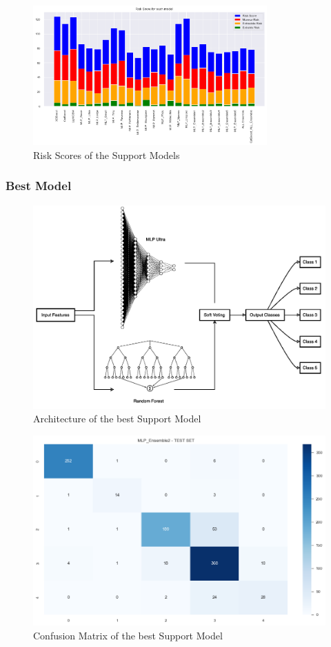 \begin{figure}[t]
    \centering
    \includegraphics[width=0.8\textwidth]{../images/support_models_risk_scores.png}
    \caption{Risk Scores of the Support Models}
    \label{fig:support_models_risk_scores}
\end{figure}

\subsubsection*{Best Model}

\begin{figure}[H]
    \centering
    \includegraphics[width=0.8\columnwidth]{../images/MLP_Ensamble2.png}
    \caption{Architecture of the best Support Model}
    \label{fig:MLP_Ensamble2}
\end{figure}
\begin{figure}[H]
    \centering
    \includegraphics[width=0.8\columnwidth]{../images/support_models_conf_matrix.png}
    \caption{Confusion Matrix of the best Support Model}
    \label{fig:support_models_conf_matrix}
\end{figure}

